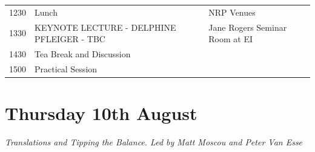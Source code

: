 \documentclass[12pt,]{book}
\begin{document}
\begin{longtable}[]{@{}lll@{}}
\begin{minipage}[t]{0.09\columnwidth}
1230\strut
\end{minipage} & \begin{minipage}[t]{0.35\columnwidth}\raggedright\strut
Lunch\strut
\end{minipage} & \begin{minipage}[t]{0.38\columnwidth}\raggedright\strut
NRP Venues\strut
\end{minipage}\tabularnewline
\begin{minipage}[t]{0.09\columnwidth}\raggedright\strut
1330\strut
\end{minipage} & \begin{minipage}[t]{0.35\columnwidth}\raggedright\strut
KEYNOTE LECTURE - DELPHINE PFLEIGER - TBC\strut
\end{minipage} & \begin{minipage}[t]{0.38\columnwidth}\raggedright\strut
Jane Rogers Seminar Room at EI\strut
\end{minipage}\tabularnewline
\begin{minipage}[t]{0.09\columnwidth}\raggedright\strut
1430\strut
\end{minipage} & \begin{minipage}[t]{0.35\columnwidth}\raggedright\strut
Tea Break and Discussion\strut
\end{minipage} & \begin{minipage}[t]{0.38\columnwidth}\raggedright\strut
\strut
\end{minipage}\tabularnewline
\begin{minipage}[t]{0.09\columnwidth}\raggedright\strut
1500\strut
\end{minipage} & \begin{minipage}[t]{0.35\columnwidth}\raggedright\strut
Practical Session\strut
\end{minipage} & \begin{minipage}[t]{0.38\columnwidth}\raggedright\strut
\strut
\end{minipage}\tabularnewline
\bottomrule
\end{longtable}

\section*{Thursday 10th August}\label{thursday-10th-august}

\emph{Translations and Tipping the Balance. Led by Matt Moscou and Peter
Van Esse}
\end{document}
